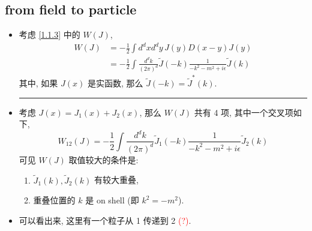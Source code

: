 \subsection{from field to particle}
\begin{itemize}
	\item 考虑 \eqref{1.1.3} 中的 $W(J)$,
	\begin{align}
		W(J) &= - \frac{1}{2} \int d^d x d^d y \, J(y) D(x - y) J(y) \\
		&= - \frac{1}{2} \int \frac{d^d k}{(2 \pi)^d} \tilde{J}(- k) \frac{1}{- k^2 - m^2 + i \epsilon} \tilde{J}(k)
	\end{align}
	其中, 如果 $J(x)$ 是实函数, 那么 $\tilde{J}(- k) = \tilde{J}^*(k)$.
	
	\noindent\rule[0.5ex]{\linewidth}{0.5pt} %
	
	\item 考虑 $J(x) = J_1(x) + J_2(x)$, 那么 $W(J)$ 共有 4 项, 其中一个交叉项如下,
	\begin{equation}
		W_{1 2}(J) = - \frac{1}{2} \int \frac{d^d k}{(2 \pi)^d} \tilde{J}_1(- k) \frac{1}{- k^2 - m^2 + i \epsilon} \tilde{J}_2(k)
	\end{equation}
	可见 $W(J)$ 取值较大的条件是:
	\begin{enumerate}
		\item $\tilde{J}_1(k), \tilde{J}_2(k)$ 有较大重叠,
		
		\item 重叠位置的 $k$ 是 on shell (即 $k^2 = - m^2$).
	\end{enumerate}
	
	\item 可以看出来, 这里有一个粒子从 1 传递到 2 \textcolor{red}{(?)}.
\end{itemize}

